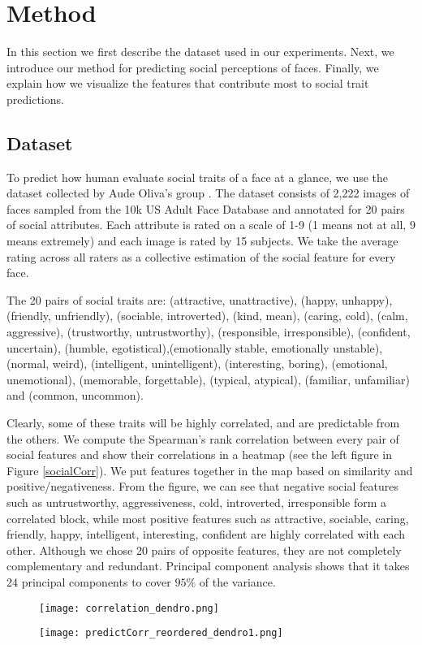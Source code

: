 \documentclass[10pt,twocolumn,letterpaper]{article}
\begin{document}
\section{Method} \label{method}
In this section we first describe the dataset used in our experiments. Next, we introduce our method for predicting social perceptions of faces. Finally, we explain how we visualize the features that contribute most to social trait predictions.

\subsection{Dataset}
To predict how human evaluate social traits of a face at a glance, we use the dataset collected by Aude Oliva's group \cite{bainbridge2013intrinsic}. The dataset consists of 2,222 images of faces sampled from the 10k US Adult Face Database and annotated for 20 pairs of social attributes. Each attribute is rated on a scale of 1-9 (1 means not at all, 9 means extremely) and each image is rated by 15 subjects. We take the average rating across all raters as a collective estimation of the social feature for every face. 

The 20 pairs of social traits are: (attractive, unattractive), (happy, unhappy), (friendly, unfriendly), (sociable, introverted), (kind, mean), (caring, cold), (calm, aggressive), (trustworthy, untrustworthy), (responsible, irresponsible), (confident, uncertain), (humble, egotistical),(emotionally stable, emotionally unstable), (normal, weird), (intelligent, unintelligent), (interesting, boring), (emotional, unemotional), (memorable, forgettable), (typical, atypical), (familiar, unfamiliar) and (common, uncommon).

Clearly, some of these traits will be highly correlated, and are predictable from the others. We compute the Spearman's rank correlation between every pair of social features and show their correlations in a heatmap (see the left figure in Figure \ref{socialCorr}). We put features together in the map based on similarity and positive/negativeness. From the figure, we can see that negative social features such as untrustworthy, aggressiveness, cold, introverted, irresponsible form a correlated block, while most positive features such as attractive, sociable, caring, friendly, happy, intelligent, interesting, confident are highly correlated with each other. Although we chose 20 pairs of opposite features, they are not completely complementary and redundant. Principal component analysis shows that it takes 24 principal components to cover $95\%$ of the variance. 
\begin{figure*}[th]
\begin{subfigure}{.5\textwidth}
      \centering     
      \texttt{[image: correlation\_dendro.png]}   
\end{subfigure}%
\begin{subfigure}{.5\textwidth}
      \centering     
      \texttt{[image: predictCorr\_reordered\_dendro1.png]}
\end{subfigure}
\caption{Correlation heatmaps among social features. Left: human. Right: network.}
\label{socialCorr}
\end{figure*}
\end{document}
